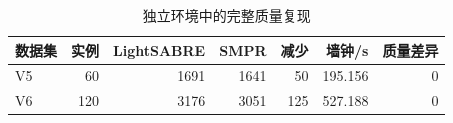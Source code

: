 \begin{table}[H]
\centering
\small
\caption{独立环境中的完整质量复现}
\label{tab:independent-reproduction}
\begin{tabular}{lrrrrrr}
\toprule
数据集 & 实例 & LightSABRE & SMPR & 减少 & 墙钟/s & 质量差异 \\
\midrule
V5 & 60 & 1691 & 1641 & 50 & 195.156 & 0 \\
V6 & 120 & 3176 & 3051 & 125 & 527.188 & 0 \\
\bottomrule
\end{tabular}
\end{table}
